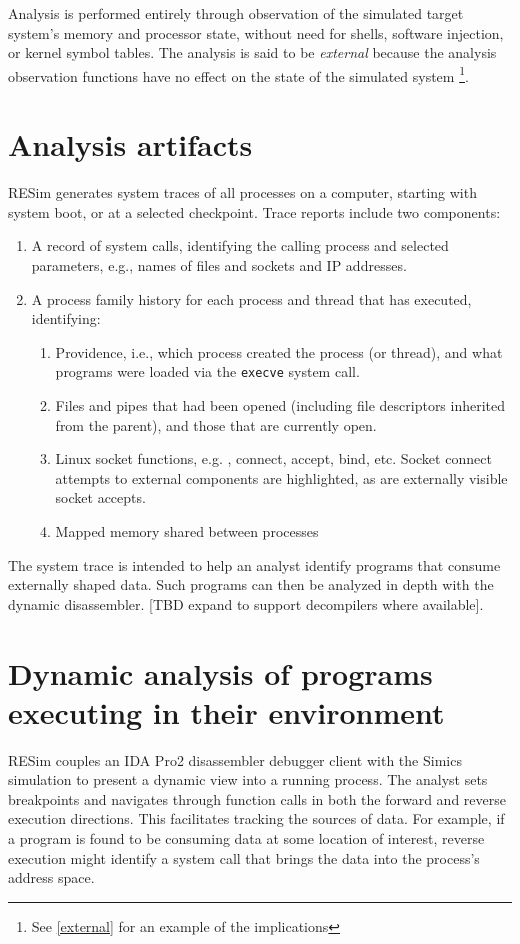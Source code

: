 \documentclass[titlepage]{article}
\begin{document}
Analysis is performed entirely through observation of the simulated target system's memory and processor state, 
without need for shells, software injection, or kernel symbol tables.   The analysis is said to be \textit{external} because the analysis observation functions have no effect on the state of the simulated system \footnote{See \ref{external} for an example of the implications}.

\section{Analysis artifacts}
RESim generates system traces of all processes on a computer, starting with system boot, or at a selected checkpoint.  Trace reports include two components: 
\begin{enumerate}
\item A record of system calls, identifying the calling process and selected parameters, e.g., names of files and sockets and IP addresses.
\item A process family history for each process and thread that has executed, identifying:
\begin{enumerate}
\item Providence, i.e., which process created the process (or thread), and what programs were loaded via the {\tt execve} system call.
\item Files and pipes that had been opened (including file descriptors inherited from the parent), and those that are currently open.
\item Linux socket functions, e.g. , connect, accept, bind, etc.  Socket connect attempts to external components are highlighted, as are 
externally visible socket accepts.
\item Mapped memory shared between processes
\end{enumerate}
\end{enumerate}

The system trace is intended to help an analyst identify programs that consume externally shaped data.  Such programs can then be analyzed in depth with the dynamic disassembler. [TBD expand to support decompilers where available].  

\section{Dynamic analysis of programs executing in their environment}
RESim couples an IDA Pro2 disassembler debugger client with the Simics simulation to present a dynamic view into a running process.  The analyst sets breakpoints and navigates through function calls in both the forward and reverse execution directions.  This facilitates tracking the sources of data.  For example, if a program is found to be consuming data at some location of interest, reverse execution might identify a system call that brings the data into the process’s address space.
\end{document}
